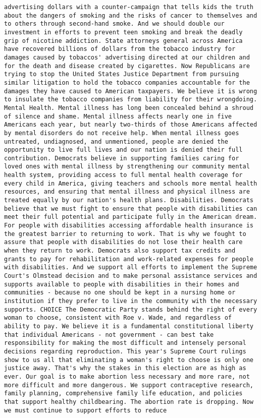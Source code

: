 \documentclass[
]{article}
\begin{document}
\begin{verbatim}
advertising dollars with a counter-campaign that tells kids the truth about the dangers of smoking and the risks of cancer to themselves and to others through second-hand smoke. And we should double our investment in efforts to prevent teen smoking and break the deadly grip of nicotine addiction. State attorneys general across America have recovered billions of dollars from the tobacco industry for damages caused by tobaccos' advertising directed at our children and for the death and disease created by cigarettes. Now Republicans are trying to stop the United States Justice Department from pursuing similar litigation to hold the tobacco companies accountable for the damages they have caused to American taxpayers. We believe it is wrong to insulate the tobacco companies from liability for their wrongdoing. Mental Health. Mental illness has long been concealed behind a shroud of silence and shame. Mental illness affects nearly one in five Americans each year, but nearly two-thirds of those Americans affected by mental disorders do not receive help. When mental illness goes untreated, undiagnosed, and unmentioned, people are denied the opportunity to live full lives and our nation is denied their full contribution. Democrats believe in supporting families caring for loved ones with mental illness by strengthening our community mental health system, providing access to full mental health coverage for every child in America, giving teachers and schools more mental health resources, and ensuring that mental illness and physical illness are treated equally by our nation's health plans. Disabilities. Democrats believe that we must fight to ensure that people with disabilities can meet their full potential and participate fully in the American dream. For people with disabilities accessing affordable health insurance is the greatest barrier to returning to work. That is why we fought to assure that people with disabilities do not lose their health care when they return to work. Democrats also support tax credits and grants to pay for rehabilitation and work-related expenses for people with disabilities. And we support all efforts to implement the Supreme Court's Olmstead decision and to make personal assistance services and supports available to people with disabilities in their homes and communities - because no one should be kept in a nursing home or institution if they prefer to live in the community with the necessary supports. CHOICE The Democratic Party stands behind the right of every woman to choose, consistent with Roe v. Wade, and regardless of ability to pay. We believe it is a fundamental constitutional liberty that individual Americans - not government - can best take responsibility for making the most difficult and intensely personal decisions regarding reproduction. This year's Supreme Court rulings show to us all that eliminating a woman's right to choose is only one justice away. That's why the stakes in this election are as high as ever. Our goal is to make abortion less necessary and more rare, not more difficult and more dangerous. We support contraceptive research, family planning, comprehensive family life education, and policies that support healthy childbearing. The abortion rate is dropping. Now we must continue to support efforts to reduce 
\end{verbatim}
\end{document}
